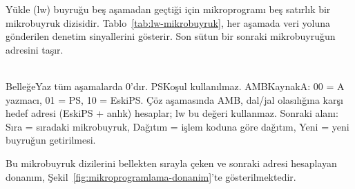 Yükle (lw) buyruğu beş aşamadan geçtiği için mikroprogramı beş satırlık bir mikrobuyruk dizisidir. Tablo~\ref{tab:lw-mikrobuyruk}, her aşamada veri yoluna gönderilen denetim sinyallerini gösterir. Son sütun bir sonraki mikrobuyruğun adresini taşır.

\begin{table}[htbp]
\centering
\caption{lw buyruğu için mikrobuyruk dizisi}
\label{tab:lw-mikrobuyruk}
\footnotesize
{}
\\[0.3em]
{\scriptsize BelleğeYaz tüm aşamalarda 0'dır. PSKoşul kullanılmaz. AMBKaynakA: 00 = A yazmacı, 01 = PS, 10 = EskiPS. Çöz aşamasında AMB, dal/jal olasılığına karşı hedef adresi (EskiPS + anlık) hesaplar; lw bu değeri kullanmaz. Sonraki alanı: Sıra = sıradaki mikrobuyruk, Dağıtım = işlem koduna göre dağıtım, Yeni = yeni buyruğun getirilmesi.}
\end{table}

Bu mikrobuyruk dizilerini bellekten sırayla çeken ve sonraki adresi hesaplayan donanım, Şekil~\ref{fig:mikroprogramlama-donanim}'te gösterilmektedir.

